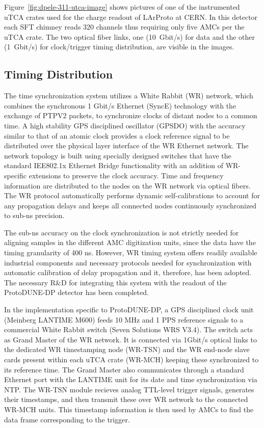 Figure~\ref{fig:dpele-311-utca-image} shows pictures of one of the instrumented uTCA crates used for the charge readout of LArProto at CERN. In this detector each SFT chimney reads \num{320} channels thus requiring only five AMCs per the uTCA crate. The two optical fiber links, one (\SI{10}{Gbit/s}) for data and the other (\SI{1}{Gbit/s}) for clock/trigger timing distribution, are visible in the images.       

\subsection{Timing Distribution}
\label{sec:fddp-tpc-elec-wr}
The time synchronization system utilizes a White Rabbit (WR) network, which combines the synchronous 1 Gbit/s Ethernet (SyncE) technology with the exchange of PTPV2 packets, to synchronize clocks of distant nodes to a common time. A high stability GPS disciplined oscillator (GPSDO) with the accuracy similar to that of an atomic clock provides a clock reference signal to be distributed over the physical layer interface of the WR Ethernet network. The network topology is built using specially designed switches that have the standard IEE802.1x Ethernet Bridge functionality with an addition of WR-specific extensions to preserve the clock accuracy. Time and frequency information are distributed to the nodes on the WR network via optical fibers. The WR protocol automatically performs dynamic self-calibrations to account for any propagation delays and keeps all connected nodes continuously synchronized to sub-ns precision. 

The sub-ns accuracy on the clock synchronization is not strictly needed for aligning samples in the different AMC digitization units, since the data have the timing granularity of 400 ns. However, WR timing system offers readily available industrial components and necessary protocols needed for synchronization with automatic calibration of delay propagation and it, therefore, has been adopted. The necessary R\&D for integrating this system with the readout of the ProtoDUNE-DP detector has been completed. 

In the implementation specific to ProtoDUNE-DP, a GPS disciplined clock unit (Meinberg LANTIME M600) feeds 10 MHz and 1 PPS reference signals to a commercial White Rabbit switch (Seven Solutions WRS V3.4). The switch acts as Grand Master of the WR network. It is connected via 1Gbit/s optical links to the dedicated WR timestamping node (WR-TSN) and the WR end-node slave cards present within each uTCA crate (WR-MCH) keeping these synchronized to its reference time. The Grand Master also communicates through a standard Ethernet port with the LANTIME unit for its date and time synchronization via NTP. The WR-TSN module recieves analog TTL-level trigger signals, generates their timestamps, and then transmit these over WR network to the connected WR-MCH units. This timestamp information is then used by AMCs to find the data frame corresponding to the trigger. 

